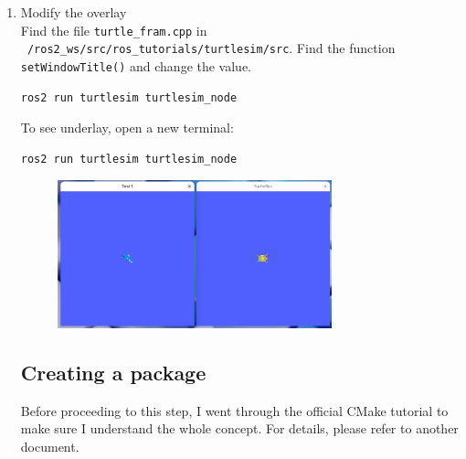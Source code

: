\documentclass[12pt, a4paper]{article}
\begin{document}
\begin{enumerate}
\newpage
\item Modify the overlay\\
Find the file \texttt{turtle\_fram.cpp} in \\\texttt{~/ros2\_ws/src/ros\_tutorials/turtlesim/src}. Find the function \texttt{setWindowTitle()} and change the value.
\begin{lstlisting}[language=bash]
ros2 run turtlesim turtlesim_node
\end{lstlisting}
To see underlay, open a new terminal:
\begin{lstlisting}[language=bash]
ros2 run turtlesim turtlesim_node
\end{lstlisting}
\begin{figure}[h]
	\centering
	\includegraphics[width=0.75\textwidth]{2/p2.2-2}
\end{figure}

\newpage
\subsection{Creating a package}
Before proceeding to this step, I went through the official CMake tutorial to make sure I understand the whole concept. For details, please refer to another document.

	
\end{enumerate}
\end{document}
